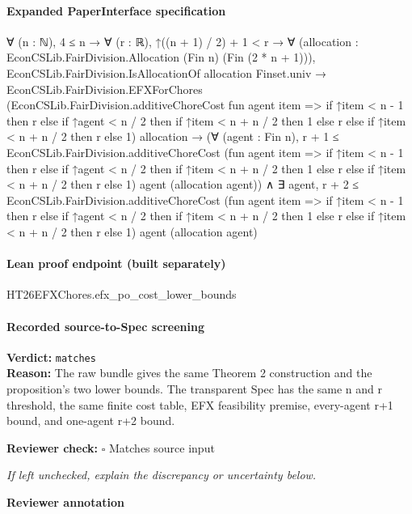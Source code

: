 \documentclass[10pt]{article}
\newcommand{\reviewerbox}{%
  \par\noindent\fbox{\parbox{0.96\linewidth}{\rule{0pt}{0.38in}}}\par
}
\newcommand{\reviewmatch}[1]{%
  \par\noindent\textbf{Reviewer check:} $\square$\; #1\par
  \noindent\emph{If left unchecked, explain the discrepancy or uncertainty below.}\par
}
\begin{document}
\paragraph{Expanded PaperInterface specification}
\begin{ReviewVerbatim}
∀ (n : ℕ),
  4 ≤ n →
    ∀ (r : ℝ),
      ↑((n + 1) / 2) + 1 < r →
        ∀ (allocation : EconCSLib.FairDivision.Allocation (Fin n) (Fin (2 * n + 1))),
          EconCSLib.FairDivision.IsAllocationOf allocation Finset.univ →
            EconCSLib.FairDivision.EFXForChores
                (EconCSLib.FairDivision.additiveChoreCost fun agent item =>
                  if ↑item < n - 1 then r
                  else
                    if ↑agent < n / 2 then if ↑item < n + n / 2 then 1 else r else if ↑item < n + n / 2 then r else 1)
                allocation →
              (∀ (agent : Fin n),
                  r + 1 ≤
                    EconCSLib.FairDivision.additiveChoreCost
                      (fun agent item =>
                        if ↑item < n - 1 then r
                        else
                          if ↑agent < n / 2 then if ↑item < n + n / 2 then 1 else r
                          else if ↑item < n + n / 2 then r else 1)
                      agent (allocation agent)) ∧
                ∃ agent,
                  r + 2 ≤
                    EconCSLib.FairDivision.additiveChoreCost
                      (fun agent item =>
                        if ↑item < n - 1 then r
                        else
                          if ↑agent < n / 2 then if ↑item < n + n / 2 then 1 else r
                          else if ↑item < n + n / 2 then r else 1)
                      agent (allocation agent)
\end{ReviewVerbatim}

\paragraph{Lean proof endpoint (built separately)}\begin{ReviewVerbatim}
HT26EFXChores.efx_po_cost_lower_bounds
\end{ReviewVerbatim}

\paragraph{Recorded source-to-Spec screening}
\textbf{Verdict:} \texttt{matches}
\\
\textbf{Reason:} The raw bundle gives the same Theorem 2 construction and the proposition's two lower bounds. The transparent Spec has the same n and r threshold, the same finite cost table, EFX feasibility premise, every-agent r+1 bound, and one-agent r+2 bound.
\reviewmatch{Matches source input}
\noindent\textbf{Reviewer annotation}\par
\reviewerbox
\clearpage
\hypertarget{source-claim-03ed4c5388a9d78f}{}
\end{document}
